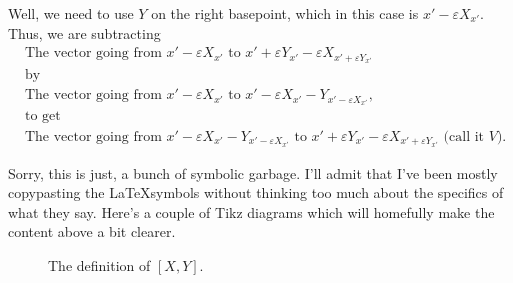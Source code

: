 \documentclass{article}
\theoremstyle{definition}
\begin{document}
Well, we need to use $Y$ on the right basepoint, which in this case is $x' - \varepsilon X_{x'}$. Thus, we are subtracting
\begin{equation}
\begin{aligned}
&\text{The vector going from } x' - \varepsilon X_{x'} \text{ to } x' + \varepsilon Y_{x'} - \varepsilon X_{x' + \varepsilon Y_{x'}}\\
&\text{by}\\
&\text{The vector going from } x' - \varepsilon X_{x'} \text{ to } x' - \varepsilon X_{x'} - Y_{x' - \varepsilon X_{x'}},\\
&\text{to get}\\
&\text{The vector going from } x' - \varepsilon X_{x'} - Y_{x' - \varepsilon X_{x'}} \text{ to } x' + \varepsilon Y_{x'} - \varepsilon X_{x' + \varepsilon Y_{x'}} \text{ (call it $V$)}.
\end{aligned}
\end{equation}

Sorry, this is just, a bunch of symbolic garbage. I'll admit that I've been mostly copypasting the \LaTeX symbols without thinking too much about the specifics of what they say. Here's a couple of Tikz diagrams which will homefully make the content above a bit clearer.

\begin{figure}[H]
\centering
{}
\caption{The definition of $[X,Y]$.}\label{fig:1}
\end{figure}
\end{document}
